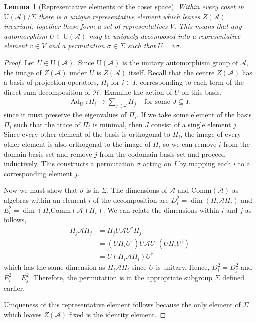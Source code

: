 \documentclass[11pt, twocolumn, floatfix, superscriptaddress, aps, prb, raggedbottom]{revtex4-2}
\newtheorem{lemma}[theorem]{Lemma}
\newcommand{\comm}{\mathrm{Comm}}
\DeclareMathOperator{\Ad}{Ad}
\begin{document}
\begin{lemma}[Representative elements of the coset space]  
    Within every coset in $\mathrm{U}(\mathcal{A})/\Sigma$ there is a unique representative element which leaves $Z(\mathcal{A})$ invariant, together these form a set of representatives $V$. This means that any automorphism $U \in \mathrm{U}(\mathcal{A})$ may be uniquely decomposed into a representative element $v \in V$ and a permutation $\sigma \in \Sigma$ such that $U = v \sigma$.
    \label{lemma:U_unique_decomposition}
\end{lemma}
\begin{proof}
  Let $U \in \mathrm{U}(\mathcal{A})$.
  Since $\mathrm{U}(\mathcal{A})$ is the unitary automorphism group of $\mathcal{A}$, the image of $Z(\mathcal{A})$ under $U$ is $Z(\mathcal{A})$ itself.
  Recall that the centre $Z(\mathcal{A})$ has a basis of projection operators, $\Pi_i$ for $i \in I$, corresponding to each term of the direct sum decomposition of $\mathcal{H}$.
  Examine the action of $U$ on this basis,
  \begin{align}
      \Ad_U : \Pi_i \mapsto \sum_{j \in J} \Pi_j & \text{ for some $J \subseteq I$.}
  \end{align}
  since it must preserve the eigenvalues of $\Pi_i$.
  If we take some element of the basis $\Pi_i$ such that the trace of $\Pi_i$ is minimal, then $J$ consist of a single element $j$.
  Since every other element of the basis is orthogonal to $\Pi_i$, the image of every other element is also orthogonal to the image of $\Pi_i$ so we can remove $i$ from the domain basis set and remove $j$ from the codomain basis set and proceed inductively.
  This constructs a permutation $\sigma$ acting on $I$ by mapping each $i$ to a corresponding element $j$.

  Now we must show that $\sigma$ is in $\Sigma$.
  The dimensions of $\mathcal{A}$ and $\comm(\mathcal{A})$ as algebras within an element $i$ of the decomposition are $D_i^2 = \dim (\Pi_i \mathcal{A} \Pi_i)$ and $E_i^2 = \dim(\Pi_i \comm(\mathcal{A}) \Pi_i)$.
  We can relate the dimensions within $i$ and $j$ as follows,
  \begin{align}
      \Pi_j \mathcal{A} \Pi_j
      &= \Pi_j U \mathcal{A} U^\dagger \Pi_j \\
      &= (U \Pi_i U^\dagger) U \mathcal{A} U^\dagger (U \Pi_i U^\dagger) \\
      &= U (\Pi_i \mathcal{A} \Pi_i) U^\dagger
  \end{align}
  which has the same dimension as $\Pi_i \mathcal{A} \Pi_i$ since $U$ is unitary.
  Hence, $D_i^2 = D_j^2$ and $E_i^2 = E_j^2$.
  Therefore, the permutation is in the appropriate subgroup $\Sigma$ defined earlier.

  Uniqueness of this representative element follows because the only element of $\Sigma$ which leaves $Z(\mathcal{A})$ fixed is the identity element.
\end{proof}
\end{document}
